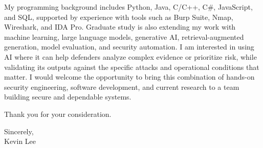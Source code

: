 \documentclass[12pt]{article}
\begin{document}
My programming background includes Python, Java, C/C++, C\#, JavaScript, and SQL, supported by experience with tools such as Burp Suite, Nmap, Wireshark, and IDA Pro. Graduate study is also extending my work with machine learning, large language models, generative AI, retrieval-augmented generation, model evaluation, and security automation. I am interested in using AI where it can help defenders analyze complex evidence or prioritize risk, while validating its outputs against the specific attacks and operational conditions that matter. I would welcome the opportunity to bring this combination of hands-on security engineering, software development, and current research to a team building secure and dependable systems.

Thank you for your consideration.

Sincerely,\\
Kevin Lee
\end{document}
